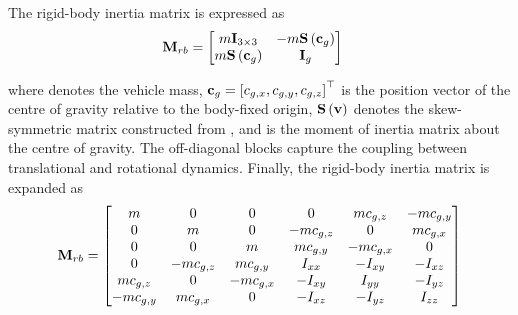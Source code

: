 The rigid-body inertia matrix  is expressed as
\begin{align}
	\lrdmatr{M}{rb} & =
	\begin{bmatrix}
		m \lrdmatr{I}{3\times 3}             & -m \matr{S}\left(\ldvect{c}{g}\right) \\
		m \matr{S}\left(\ldvect{c}{g}\right) & \lrdmatr{I}{g}
	\end{bmatrix}
\end{align}

where  denotes the vehicle mass, $\ldvect{c}{g}=\left[\ldscal{c}{g,x}, \ldscal{c}{g,y},
		\ldscal{c}{g,z}\right]^{\top}$ is the position vector of the centre of gravity relative to the
body-fixed origin, $\matr{S}\left(\vect{v}\right)$ denotes the skew-symmetric matrix constructed
from , and  is the moment of inertia matrix about the centre of gravity. The
off-diagonal blocks capture the coupling between translational and rotational dynamics. Finally,
the rigid-body inertia matrix is expanded as
\begin{align}
	\lrdmatr{M}{rb} = \begin{bmatrix}
		                  \scal{m}                   & 0                          & 0                          & 0                          & \scal{m} \ldscal{c}{g, z}  & -\scal{m} \ldscal{c}{g, y} \\
		                  0                          & \scal{m}                   & 0                          & -\scal{m} \ldscal{c}{g, z} & 0                          & \scal{m} \ldscal{c}{g, x}  \\
		                  0                          & 0                          & \scal{m}                   & \scal{m} \ldscal{c}{g, y}  & -\scal{m} \ldscal{c}{g, x} & 0                          \\
		                  0                          & -\scal{m} \ldscal{c}{g, z} & \scal{m} \ldscal{c}{g, y}  & \ldscal{I}{xx}             & -\ldscal{I}{xy}            & -\ldscal{I}{xz}            \\
		                  \scal{m} \ldscal{c}{g, z}  & 0                          & -\scal{m} \ldscal{c}{g, x} & -\ldscal{I}{xy}            & \ldscal{I}{yy}             & -\ldscal{I}{yz}            \\
		                  -\scal{m} \ldscal{c}{g, y} & \scal{m} \ldscal{c}{g, x}  & 0                          & -\ldscal{I}{xz}            & -\ldscal{I}{yz}            & \ldscal{I}{zz}
	                  \end{bmatrix}
\end{align}

